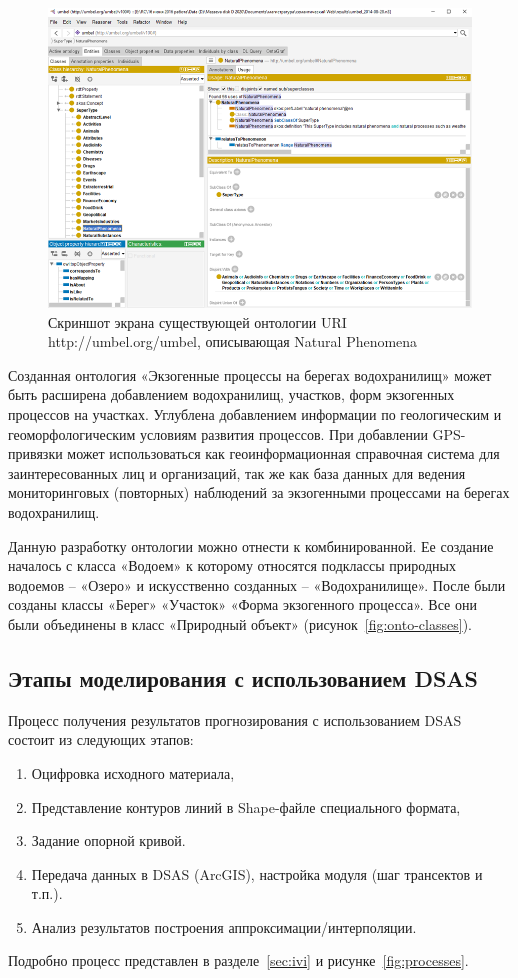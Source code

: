 \documentclass[732,fontsize=14pt,final]{studrep}
\begin{document}
  \begin{figure}[htp]
	\centering
	\includegraphics[width=0.9\linewidth]{pics/image14.png}
    \caption{Скриншот экрана существующей онтологии URI http://umbel.org/umbel, описывающая Natural Phenomena}
    \label{fig:umbel}
  \end{figure}

Созданная онтология «Экзогенные процессы на берегах водохранилищ» может быть расширена добавлением водохранилищ, участков, форм экзогенных процессов на участках. Углублена добавлением информации по геологическим и геоморфологическим условиям развития процессов. При добавлении GPS-привязки может использоваться как геоинформационная справочная система для заинтересованных лиц и организаций, так же как база данных для ведения мониторинговых (повторных) наблюдений за экзогенными процессами на берегах водохранилищ.

Данную разработку онтологии можно отнести к комбинированной. Ее создание началось с класса «Водоем» к которому относятся подклассы природных водоемов – «Озеро» и искусственно созданных – «Водохранилище». После были созданы классы «Берег» «Участок» «Форма экзогенного процесса». Все они были объединены в класс «Природный объект» (рисунок~\ref{fig:onto-classes}).

\subsection{Этапы моделирования с использованием DSAS}
\label{sec:model-stages}

Процесс получения результатов прогнозирования с использованием DSAS~\cite{isha20} состоит из следующих этапов:
\begin{enumerate}
\item Оцифровка исходного материала,
\item Представление контуров линий в Shape-файле специального формата,
\item Задание опорной кривой.
\item Передача данных в DSAS (ArcGIS), настройка модуля (шаг трансектов и т.п.).
\item Анализ результатов построения аппроксимации/интерполяции.
\end{enumerate}
Подробно процесс представлен в разделе~\ref{sec:ivi} и рисунке~\ref{fig:processes}.
\end{document}
